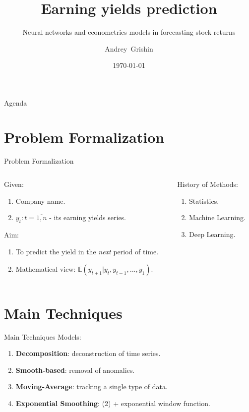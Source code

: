 \documentclass[aspectratio= 169]{beamer}
\title{Earning yields prediction}
\subtitle{Neural networks and econometrics models in forecasting stock returns}
\author{Andrey~Grishin}
\institute[Faculty of Economics MSU]{Faculty of Economics Moscow State University}
\date{\today}
\begin{document}
	
	\begin{frame}
		\titlepage
	\end{frame}

	\begin{frame}{Agenda}
		\tableofcontents
	\end{frame}

	\section{Problem Formalization}
	\begin{frame}{Problem Formalization}
		
		\begin{columns}[T]
			\begin{column}{.59\textwidth}
				
					Given:
					\begin{enumerate}
						\item Company name.
						\item ${y_t: t = \overline{1, n}}$ - its earning yields series.
					\end{enumerate}
					Aim:
					\begin{enumerate}
						\item To predict the yield in the \textit{next} period of time. 
						\item Mathematical view: ${\mathbb{E} \left(y_{t+1} | y_t, y_{t - 1}, ..., y_1 \right)}$.
					\end{enumerate}
					
				\end{column}%
				\hfill%
				\begin{column}{.32\textwidth}
					History of Methods:
						\begin{enumerate}
							\item Statistics.
							\item Machine Learning.
							\item Deep Learning.
						\end{enumerate}
				\end{column}
			
			\end{columns}

	\end{frame}

	\section{Main Techniques}
	\begin{frame}{Main Techniques}
		Models:
		\begin{enumerate}
			\item \textbf{Decomposition}: deconstruction of time series.
			\item \textbf{Smooth-based}: removal of anomalies.
			\item \textbf{Moving-Average}: tracking a single type of data.
			\item \textbf{Exponential Smoothing}: (2) + exponential window function.
		\end{enumerate}
	\end{frame}
\end{document}
